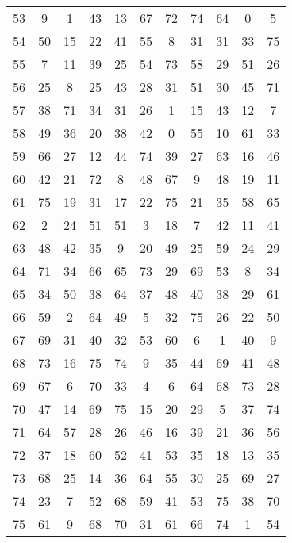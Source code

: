\begin{table}
\begin{tabular}{c c c c c c c c c c c }
53 & 9 & 1 & 43 & 13 & 67 & 72 & 74 & 64 & 0 & 5 \\
54 & 50 & 15 & 22 & 41 & 55 & 8 & 31 & 31 & 33 & 75 \\
55 & 7 & 11 & 39 & 25 & 54 & 73 & 58 & 29 & 51 & 26 \\
56 & 25 & 8 & 25 & 43 & 28 & 31 & 51 & 30 & 45 & 71 \\
57 & 38 & 71 & 34 & 31 & 26 & 1 & 15 & 43 & 12 & 7 \\
58 & 49 & 36 & 20 & 38 & 42 & 0 & 55 & 10 & 61 & 33 \\
59 & 66 & 27 & 12 & 44 & 74 & 39 & 27 & 63 & 16 & 46 \\
60 & 42 & 21 & 72 & 8 & 48 & 67 & 9 & 48 & 19 & 11 \\
61 & 75 & 19 & 31 & 17 & 22 & 75 & 21 & 35 & 58 & 65 \\
62 & 2 & 24 & 51 & 51 & 3 & 18 & 7 & 42 & 11 & 41 \\
63 & 48 & 42 & 35 & 9 & 20 & 49 & 25 & 59 & 24 & 29 \\
64 & 71 & 34 & 66 & 65 & 73 & 29 & 69 & 53 & 8 & 34 \\
65 & 34 & 50 & 38 & 64 & 37 & 48 & 40 & 38 & 29 & 61 \\
66 & 59 & 2 & 64 & 49 & 5 & 32 & 75 & 26 & 22 & 50 \\
67 & 69 & 31 & 40 & 32 & 53 & 60 & 6 & 1 & 40 & 9 \\
68 & 73 & 16 & 75 & 74 & 9 & 35 & 44 & 69 & 41 & 48 \\
69 & 67 & 6 & 70 & 33 & 4 & 6 & 64 & 68 & 73 & 28 \\
70 & 47 & 14 & 69 & 75 & 15 & 20 & 29 & 5 & 37 & 74 \\
71 & 64 & 57 & 28 & 26 & 46 & 16 & 39 & 21 & 36 & 56 \\
72 & 37 & 18 & 60 & 52 & 41 & 53 & 35 & 18 & 13 & 35 \\
73 & 68 & 25 & 14 & 36 & 64 & 55 & 30 & 25 & 69 & 27 \\
74 & 23 & 7 & 52 & 68 & 59 & 41 & 53 & 75 & 38 & 70 \\
75 & 61 & 9 & 68 & 70 & 31 & 61 & 66 & 74 & 1 & 54 \\
\hline
\end{tabular}
\end{table}